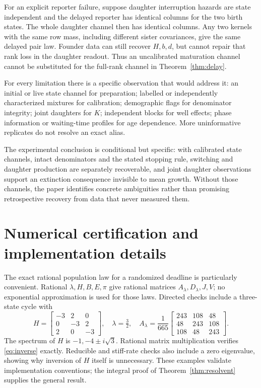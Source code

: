 \documentclass[11pt]{article}
\theoremstyle{definition}
\begin{document}
For an explicit reporter failure, suppose daughter interruption hazards are
state independent and the delayed reporter has identical columns for the two
birth states. The whole daughter channel then has identical columns. Any two
kernels with the same row mass, including different sister covariances, give the
same delayed pair law. Founder data can still recover $H,b,d$, but cannot repair
that rank loss in the daughter readout. Thus an uncalibrated maturation channel
cannot be substituted for the full-rank channel in Theorem~\ref{thm:delay}.

For every limitation there is a specific observation that would address it: an
initial or live state channel for preparation; labelled or independently
characterized mixtures for calibration; demographic flags for denominator
integrity; joint daughters for $K$; independent blocks for well effects; phase
information or waiting-time profiles for age dependence. More uninformative
replicates do not resolve an exact alias.

The experimental conclusion is conditional but specific: with calibrated state
channels, intact denominators and the stated stopping rule, switching and
daughter production are separately recoverable, and joint daughter observations
support an extinction consequence invisible to mean growth. Without those
channels, the paper identifies concrete ambiguities rather than promising
retrospective recovery from data that never measured them.

\appendix
\section{Numerical certification and implementation details}\label{app:numerics}
The exact rational population law for a randomized deadline is particularly
convenient. Rational $\lambda,H,B,E,\pi$ give rational matrices
$A_\lambda,D_\lambda,J,V$; no exponential approximation is used for those laws.
Directed checks include a three-state cycle with
\[
 H=\begin{bmatrix}-3&2&0\\0&-3&2\\2&0&-3\end{bmatrix},\quad
 \lambda=\tfrac32,\quad
 A_\lambda=\frac1{665}\begin{bmatrix}243&108&48\\48&243&108\\108&48&243\end{bmatrix}.
\]
The spectrum of $H$ is $-1,-4\pm i\sqrt3$. Rational matrix multiplication
verifies \eqref{eq:inverse} exactly. Reducible and stiff-rate checks also
include a zero eigenvalue, showing why inversion of $H$ itself is unnecessary.
These examples validate implementation conventions; the integral proof of
Theorem~\ref{thm:resolvent} supplies the general result.
\end{document}
